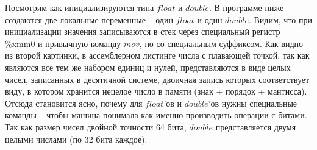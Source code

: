 \documentclass[a4paper,12pt]{article}
\begin{document}
Посмотрим как инициализируются типа $float$ и $double$. В программе ниже создаются две локальные переменные -- один $float$ и один $double$. Видим, что при инициализации значения записываются в стек через специальный регистр \%xmm0 и привычную команду $mov$, но со специальным суффиксом. Как видно из второй картинки, в ассемблерном листинге числа с плавающей точкой, так как являются всё тем же набором единиц и нулей, представляются в виде целых чисел, записанных в десятичной системе, двоичная запись которых соответствует виду, в котором хранится нецелое число в памяти (знак + порядок + мантисса). Отсюда становится ясно, почему для $float$'ов и $double$'ов нужны специальные команды -- чтобы машина понимала как именно производить операции с битами. Так как размер чисел двойной точности 64 бита, $double$ представляется двумя целыми числами (по 32 бита каждое).
\begin{figure}[H]\label{fig: Initialization float and double}
\end{figure}
\end{document}
